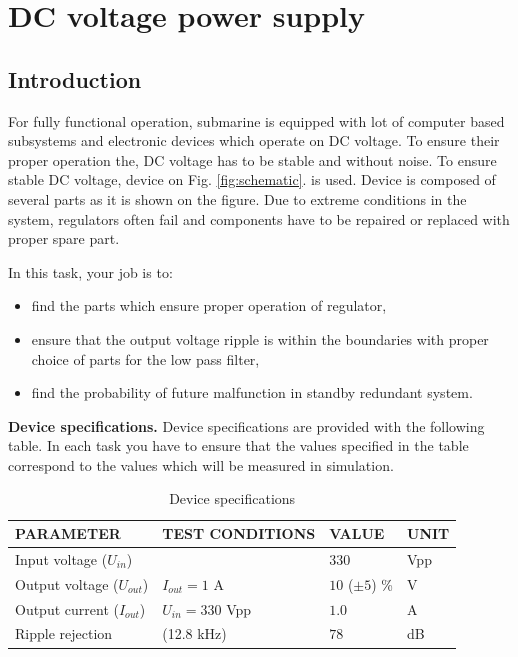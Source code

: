\documentclass[a4paper]{article}
\begin{document}
\section{DC voltage power supply}

\subsection{Introduction}

For fully functional operation, submarine is equipped with 
lot of computer based subsystems and electronic devices which operate on DC 
voltage. To ensure their proper operation the, DC voltage has to be stable and 
without noise. To ensure stable DC voltage, device on Fig. 
\ref{fig:schematic}. is used. Device is composed of several parts as it is 
shown on the figure. Due to extreme conditions in the system, regulators often 
fail and components have to be repaired or replaced with proper spare part.

In this task, your job is to:
\begin{itemize}
\item find the parts which ensure proper operation of regulator, 
\item ensure that the output voltage ripple is within the boundaries with 
proper choice of parts for the low pass filter,
\item find the probability of future malfunction in standby redundant system.
\end{itemize}

\textbf{Device specifications.} Device specifications are provided with 
the following table. In each task you have to ensure that the values specified
in the table correspond to the values which will be measured in simulation. 

\begin{table}[h!]
    \caption{Device specifications}
    \label{tab:spec}
    \begin{tabularx}{\linewidth}{|X|X|X|X|} \hline
    PARAMETER & TEST CONDITIONS & VALUE & UNIT \\ \hline
    Input voltage ($U_{in}$)&  & $330$ & Vpp \\ \hline 
    Output voltage ($U_{out}$)& $I_{out} = 1$ A & $10$ ($\pm5$) \% & V \\ \hline
    Output current ($I_{out}$) & $U_{in} = 330$ Vpp & $1.0$ & A \\ \hline
    Ripple rejection & (12.8 kHz) & $78$ & dB \\ \hline
    \end{tabularx}
\end{table}
\end{document}
